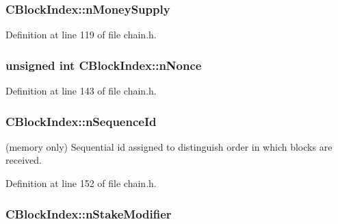 \subsubsection[{n\+Money\+Supply}]{ C\+Block\+Index\+::n\+Money\+Supply}\label{class_c_block_index_a309fdc44d871b336abe64eadf250cafd}


Definition at line 119 of file chain.\+h.

\hypertarget{class_c_block_index_a5e0a648ed1df8da171eba636d5ebef01}{}
\subsubsection[{n\+Nonce}]{\setlength{\rightskip}{0pt plus 5cm}unsigned int C\+Block\+Index\+::n\+Nonce}\label{class_c_block_index_a5e0a648ed1df8da171eba636d5ebef01}


Definition at line 143 of file chain.\+h.

\hypertarget{class_c_block_index_a4a679af5f7924cc594b8131371b21e54}{}
\subsubsection[{n\+Sequence\+Id}]{ C\+Block\+Index\+::n\+Sequence\+Id}\label{class_c_block_index_a4a679af5f7924cc594b8131371b21e54}


(memory only) Sequential id assigned to distinguish order in which blocks are received. 



Definition at line 152 of file chain.\+h.

\hypertarget{class_c_block_index_a2aa226c04d79a4d932ed6eb0abd02cbe}{}
\subsubsection[{n\+Stake\+Modifier}]{ C\+Block\+Index\+::n\+Stake\+Modifier}\label{class_c_block_index_a2aa226c04d79a4d932ed6eb0abd02cbe}


